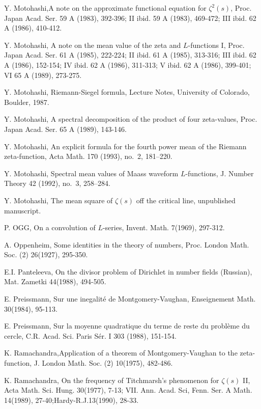 \begin{thebibliography}{99}
 Y. Motohashi,\pageoriginale A note on the approximate functional equation for $\zeta^2(s)$, Proc. Japan Acad. Ser. 59 A (1983), 392-396; II ibid. 59 A (1983), 469-472; III ibid. 62 A (1986), 410-412.
 
 Y. Motohashi, A note on the mean value of the zeta and $L$-functions I, Proc. Japan Acad. Ser. 61 A (1985), 222-224; II ibid. 61 A (1985), 313-316; III ibid. 62 A (1986), 152-154; IV ibid. 62 A (1986), 311-313; V ibid. 62 A (1986), 399-401; VI 65 A (1989), 273-275.

 Y. Motohashi, Riemann-Siegel formula, Lecture Notes, University of Colorado, Boulder, 1987.

 Y. Motohashi, A spectral decomposition of the product of four zeta-values, Proc. Japan Acad. Ser. 65 A (1989), 143-146.

 Y. Motohashi, An explicit formula for the fourth power mean of the Riemann zeta-function, Acta Math. 170 (1993), no.~2, 181--220.

 Y. Motohashi, Spectral mean values of Maass waveform $L$-functions, J. Number Theory 42 (1992), no.~3, 258--284.

 Y. Motohashi, The mean square of $\zeta(s)$ off the critical line, unpublished manuscript.

 P. OGG, On a convolution of $L$-series, Invent. Math. 7(1969), 297-312.

 A. Oppenheim, Some identities in the theory of numbers, Proc. London Math. Soc. (2) 26(1927), 295-350.

 E.I. Panteleeva, On the divisor problem of Dirichlet in number fields (Russian), Mat. Zametki 44(1988), 494-505.

 E. Preissmann, Sur une inegalit\'e de Montgomery-Vaughan, Enseignement Math. 30(1984), 95-113.

 E. Preissmann, Sur la moyenne quadratique du terme de reste du probl\`eme du cercle, C.R. Acad. Sci. Paris S\'er. I 303 (1988), 151-154.

 K. Ramachandra,\pageoriginale Application of a theorem of Montgomery-Vaughan to the zeta-function, J. London Math. Soc. (2) 10(1975), 482-486.

 K. Ramachandra, On the frequency of Titchmarsh's phenomenon for $\zeta(s)$ II, Acta Math. Sci. Hung. 30(1977), 7-13; VII. Ann. Acad. Sci, Fenn. Ser. A Math. 14(1989), 27-40;Hardy-R.J.13(1990), 28-33.


\end{thebibliography}
